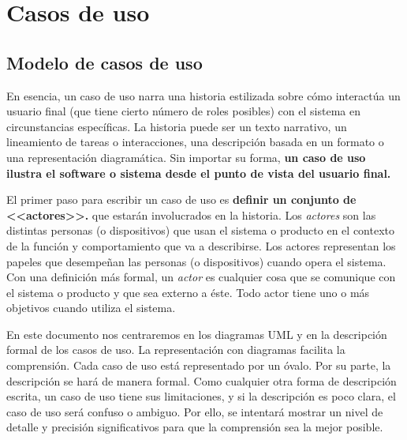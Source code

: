 \section{Casos de uso} %
\label{sec:casos_de_uso}

	
	\subsection{Modelo de casos de uso} %
		\label{sec:modelo_casos_de_uso}

			En esencia, un caso de uso narra una historia estilizada sobre cómo interactúa un usuario final (que tiene cierto número de roles posibles) con el sistema en circunstancias específicas. La historia puede ser un texto narrativo, un lineamiento de tareas o interacciones, una descripción basada en un formato o una representación diagramática. Sin importar su forma, \textbf{un caso de uso ilustra el software o sistema desde el punto de vista del usuario final.}

			\medskip

			\medskip		
			El primer paso para escribir un caso de uso es \textbf{definir un conjunto de <<actores>>.} que estarán involucrados en la historia. Los \textit{actores} son las distintas personas (o dispositivos) que usan el sistema o producto en el contexto de la función y comportamiento que va a describirse. Los actores representan los papeles que desempeñan las personas (o dispositivos) cuando opera el sistema. Con una definición más formal, un \textit{actor} es cualquier cosa que se comunique con el sistema o producto y que sea externo a éste. Todo actor tiene uno o más objetivos cuando utiliza el sistema.

			 En este documento nos centraremos en los diagramas UML y en la descripción formal de los casos de uso. La representación con diagramas facilita la comprensión. Cada caso de uso está representado por un óvalo. Por su parte, la descripción se hará de manera formal. Como cualquier otra forma de descripción escrita, un caso de uso tiene sus limitaciones, y si la descripción es poco clara, el caso de uso será confuso o ambiguo. Por ello, se intentará mostrar un nivel de detalle y precisión significativos para que la comprensión sea la mejor posible.



